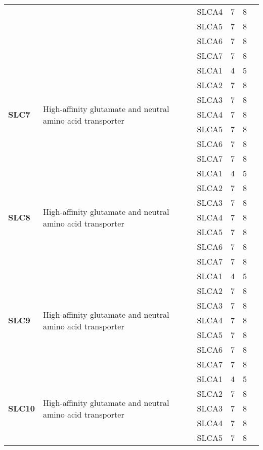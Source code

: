 \documentclass[12pt]{report}
\begin{document}
\begin{center}
\begin{longtable}{|p{1.5cm}|p{3.2cm}|p{1.9cm}|p{1.65cm}|p{3cm}|p{3cm}|}
\cline{3-6}
&&SLCA4&7 & 8&\\ 
\cline{3-6}
&&SLCA5&7 & 8&\\ 
\cline{3-6}
&&SLCA6&7 & 8&\\ 
\cline{3-6}
&&SLCA7&7 & 8&\\ 
\hline
\multirow{7}{1.5cm}{\textbf{SLC7}} & \multirow{7}{4cm}{High-affinity glutamate and neutral amino acid transporter} & SLCA1 & 4 & 5&\\ 
\cline{3-6}
&&SLCA2&7 & 8&\\ 
\cline{3-6}
&&SLCA3&7 & 8&\\ 
\cline{3-6}
&&SLCA4&7 & 8&\\ 
\cline{3-6}
&&SLCA5&7 & 8&\\ 
\cline{3-6}
&&SLCA6&7 & 8&\\ 
\cline{3-6}
&&SLCA7&7 & 8&\\ 
\hline
\multirow{7}{1.5cm}{\textbf{SLC8}} & \multirow{7}{4cm}{High-affinity glutamate and neutral amino acid transporter} & SLCA1 & 4 & 5\\ 
\cline{3-6}
&&SLCA2&7 & 8&\\ 
\cline{3-6}
&&SLCA3&7 & 8&\\ 
\cline{3-6}
&&SLCA4&7 & 8&\\ 
\cline{3-6}
&&SLCA5&7 & 8&\\ 
\cline{3-6}
&&SLCA6&7 & 8&\\ 
\cline{3-6}
&&SLCA7&7 & 8&\\ 
\hline
\multirow{7}{1.5cm}{\textbf{SLC9}} & \multirow{7}{4cm}{High-affinity glutamate and neutral amino acid transporter} & SLCA1 & 4 & 5\\ 
\cline{3-6}
&&SLCA2&7 & 8&\\ 
\cline{3-6}
&&SLCA3&7 & 8&\\ 
\cline{3-6}
&&SLCA4&7 & 8&\\ 
\cline{3-6}
&&SLCA5&7 & 8&\\ 
\cline{3-6}
&&SLCA6&7 & 8&\\ 
\cline{3-6}
&&SLCA7&7 & 8&\\ 
\hline
\multirow{7}{1.5cm}{\textbf{SLC10}} & \multirow{7}{4cm}{High-affinity glutamate and neutral amino acid transporter} & SLCA1 & 4 & 5\\ 
\cline{3-6}
&&SLCA2&7 & 8&\\ 
\cline{3-6}
&&SLCA3&7 & 8&\\ 
\cline{3-6}
&&SLCA4&7 & 8&\\ 
\cline{3-6}
&&SLCA5&7 & 8&\\ 

\end{longtable}
\end{center}
\end{document}
